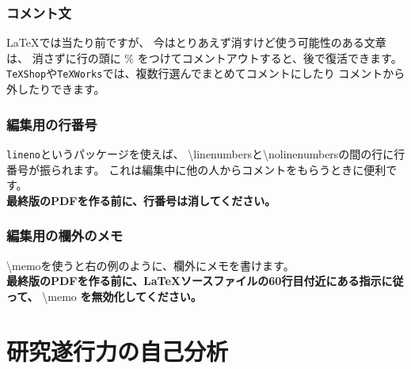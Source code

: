 \documentclass[11pt,a4j,dvipdfmx]{jarticle} 					%
\newcommand{\研究課題名}{象の卵}
\newcommand{\研究機関名}{逢坂大学}
\newcommand{\研究代表者氏名}{湯川秀樹}
\newcommand{\memo}[1]{\marginpar{#1}}
\begin{document}
        \subsubsection{コメント文}
        \LaTeX では当たり前ですが、
        今はとりあえず消すけど使う可能性のある文章は、
        消さずに行の頭に \% をつけてコメントアウトすると、後で復活できます。
        \texttt{TeXShop}や\texttt{TeXWorks}では、複数行選んでまとめてコメントにしたり
        コメントから外したりできます。
        
        \subsubsection{編集用の行番号}
        \texttt{lineno}というパッケージを使えば、
        \textbackslash linenumbersと\textbackslash nolinenumbersの間の行に行番号が振られます。
        これは編集中に他の人からコメントをもらうときに便利です。\\
        \textbf{最終版のPDFを作る前に、行番号は消してください。}
        
        \subsubsection{編集用の欄外のメモ}
        \textbackslash memo{}を使うと右の例のように、欄外にメモを書けます。\\
        \memo{欄外メモ\\だよ}
        \textbf{最終版のPDFを作る前に、\LaTeX ソースファイルの60行目付近にある指示に従って、}
        \textbackslash memo \textbf{を無効化してください。}
        
        \nolinenumbers




\section{研究遂行力の自己分析}
\end{document}
